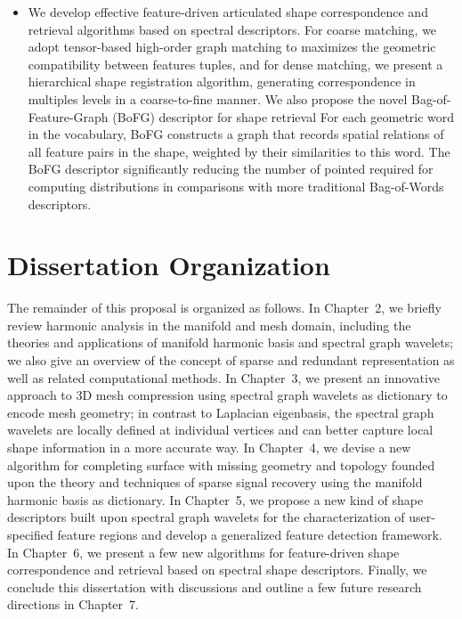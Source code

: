 \begin{itemize}
\item We develop effective feature-driven articulated shape
correspondence and retrieval algorithms based on spectral
descriptors. For coarse matching, we adopt tensor-based high-order graph matching 
to maximizes the geometric compatibility between features tuples, and for dense matching,
we present a hierarchical shape registration algorithm, generating
correspondence in multiples levels in a coarse-to-fine manner. We also
propose the novel Bag-of-Feature-Graph (BoFG) descriptor for shape retrieval
For each geometric word in the vocabulary, BoFG constructs a graph that records
spatial relations of all feature pairs in the shape, weighted by their
similarities to this word. The BoFG descriptor significantly reducing the number
of pointed required for computing distributions in comparisons with more traditional
Bag-of-Words descriptors.

\end{itemize}

\section{Dissertation Organization}
The remainder of this proposal is organized as follows.
In Chapter~2, we briefly review harmonic analysis in the manifold and mesh
domain, including the theories and applications of manifold harmonic basis
and spectral graph wavelets; we also give an overview of the concept of
sparse and redundant representation as well as related computational methods.
In Chapter~3, we present an innovative approach to 3D mesh compression
using spectral graph wavelets as dictionary to encode mesh geometry; in
contrast to Laplacian eigenbasis, the spectral graph wavelets are locally
defined at individual vertices and can better capture local shape
information in a more accurate way.
In Chapter~4, we devise a new algorithm for completing surface with missing geometry
and topology founded upon the theory and techniques of sparse signal recovery
using the manifold harmonic basis as dictionary.
In Chapter~5, we propose a new kind of shape descriptors built upon
spectral graph wavelets for the characterization of user-specified feature regions
and develop a generalized feature detection framework.
In Chapter~6, we present a few new algorithms for feature-driven shape correspondence 
and retrieval based on spectral shape descriptors. 
Finally, we conclude this dissertation 
with discussions and outline a few future research directions in Chapter~7.   